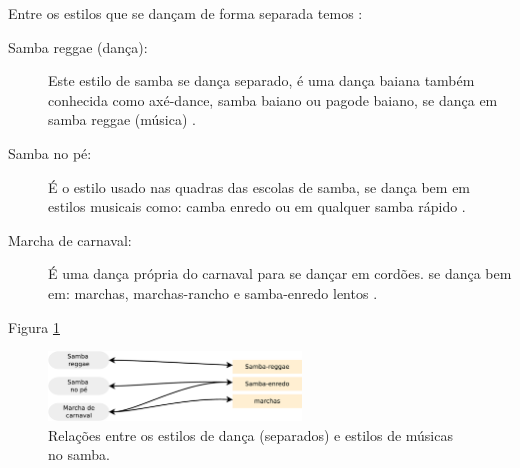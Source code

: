 Entre os estilos que se dançam de forma separada temos \cite[pp. 134]{perna2002samba}:
\begin{description}
\item[Samba reggae  (dança):] Este estilo de samba se dança separado, 
é uma dança baiana também conhecida como axé-dance, samba baiano ou pagode baiano,
se dança em samba reggae (música) \cite[pp. 134]{perna2002samba}.

\item[Samba no pé:] É o estilo usado nas quadras das escolas de samba,
se dança bem em estilos musicais como: 
camba enredo ou em qualquer samba rápido  \cite[pp. 134]{perna2002samba}.

\item[Marcha de carnaval:] É uma dança própria do carnaval para se dançar em cordões.
se dança bem em: marchas, marchas-rancho e samba-enredo lentos  \cite[pp. 135]{perna2002samba}.

\end{description}

Figura \ref{fig:sambadavavsmusicaseparado} \cite[pp. 134-138]{perna2002samba}

\begin{figure}[h]
  \centering
    \includegraphics[width=0.6\textwidth]{chapters/cap-historia-musicasamba/dancavcmusicaseparado.eps}
  \caption{Relações entre os estilos de dança (separados) e estilos de músicas no samba.}
\label{fig:sambadavavsmusicaseparado}
\end{figure}
